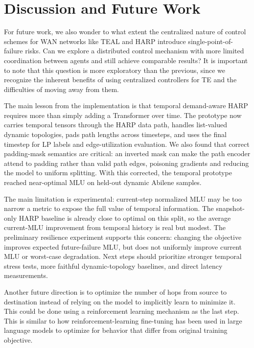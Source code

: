 \documentclass[letterpaper,twocolumn,10pt]{article}
\begin{document}
\section{Discussion and Future Work}

For future work, we also wonder to what extent the centralized nature of control schemes for WAN networks like TEAL and HARP introduce single-point-of-failure risks. Can we explore a distributed control mechanism with more limited coordination between agents and still achieve comparable results? It is important to note that this question is more exploratory than the previous, since we recognize the inherent benefits of using centralized controllers for TE and the difficulties of moving away from them.

The main lesson from the implementation is that temporal demand-aware HARP requires more than simply adding a Transformer over time. The prototype now carries temporal tensors through the HARP data path, handles list-valued dynamic topologies, pads path lengths across timesteps, and uses the final timestep for LP labels and edge-utilization evaluation. We also found that correct padding-mask semantics are critical: an inverted mask can make the path encoder attend to padding rather than valid path edges, poisoning gradients and reducing the model to uniform splitting. With this corrected, the temporal prototype reached near-optimal MLU on held-out dynamic Abilene samples.

The main limitation is experimental: current-step normalized MLU may be too narrow a metric to expose the full value of temporal information. The snapshot-only HARP baseline is already close to optimal on this split, so the average current-MLU improvement from temporal history is real but modest. The preliminary resilience experiment supports this concern: changing the objective improves expected future-failure MLU, but does not uniformly improve current MLU or worst-case degradation. Next steps should prioritize stronger temporal stress tests, more faithful dynamic-topology baselines, and direct latency measurements.

Another future direction is to optimize the number of hops from source to destination instead of relying on the model to implicitly learn to minimize it. This could be done using a reinforcement learning mechanism as the last step. This is similar to how reinforcement-learning fine-tuning has been used in large language models to optimize for behavior that differ from original training objective. 
\end{document}
